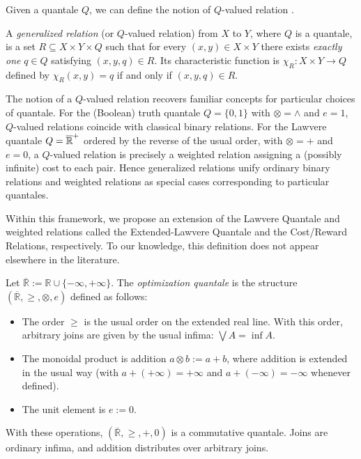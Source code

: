 Given a quantale $Q$, we can define the notion of $Q$-valued relation \cite{coecke2018generalizedrelations}.

\begin{definition}
	A \emph{generalized relation} (or $Q$-valued relation) from $X$ to $Y$, where $Q$ is a quantale, is a set
	$R \subseteq X \times Y \times Q$
	such that for every $(x,y) \in X \times Y$ there exists \emph{exactly one}
	$q \in Q$ satisfying $(x,y,q) \in R$.
	Its characteristic function is $\chi_R: X \times Y \to Q$
	defined by $\chi_R(x,y) = q$ if and only if $(x,y,q) \in R$.
\end{definition}

The notion of a $Q$-valued relation recovers familiar concepts for particular choices of quantale. For the (Boolean) truth quantale $Q = \{0,1\}$ with $\otimes = \land$ and $e = 1$, $Q$-valued relations coincide with classical binary relations. For the Lawvere quantale $Q = \overline{\mathbb{R}}^+$ ordered by the reverse of the usual order, with $\otimes = +$ and $e = 0$, a $Q$-valued relation is precisely a weighted relation assigning a (possibly infinite) cost to each pair. Hence generalized relations unify ordinary binary relations and weighted relations as special cases corresponding to particular quantales.

Within this framework, we propose an extension of the Lawvere Quantale and
weighted relations called the Extended-Lawvere Quantale and
the Cost/Reward Relations, respectively. To our knowledge, this definition does
not appear elsewhere in the literature.

\begin{definition}
	Let $\overline{\mathbb{R}} := \mathbb{R} \cup \{-\infty,+\infty\}$.
	The \emph{optimization quantale} is the structure $(\overline{\mathbb{R}},\geq,\otimes,e)$
	defined as follows:
	\begin{itemize}
		\item The order $\geq$ is the usual order on the extended real line.
		      With this order, arbitrary joins are given by the usual infima: $\bigvee A = \inf A$.
		\item The monoidal product is addition $a \otimes b := a + b$,
		      where addition is extended in the usual way
		      (with $a + (+\infty) = +\infty$ and $a + (-\infty) = -\infty$ whenever defined).
		\item The unit element is $e := 0$.
	\end{itemize}
	With these operations, $(\overline{\mathbb{R}},\geq,+,0)$
	is a commutative quantale. Joins are ordinary infima,
	and addition distributes over arbitrary joins.
\end{definition}

